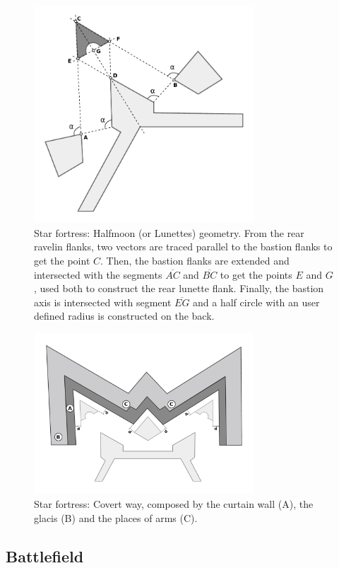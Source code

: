 \documentclass[tog]{acmsiggraph}
\begin{document}
\begin{figure}[h]
  \centering
  \includegraphics[width=3.25in]{figs/halfmoon}
  \caption{Star fortress: Halfmoon (or Lunettes) geometry. From the rear ravelin flanks, two vectors are traced parallel to the bastion flanks to get the point $C$.
Then, the bastion flanks are extended and intersected with the segments $\overline{AC}$ and $\overline{BC}$ to get the points $E$ and $G$, used both to construct the rear lunette flank.
Finally, the bastion axis is intersected with segment $\overline{EG}$ and a half circle with an user defined radius is constructed on the back. }
  \label{fig:halfmoon}
\end{figure}



\begin{figure}[!h]
  \centering
  \includegraphics[width=3.25in]{figs/covertway}
  \caption{Star fortress: Covert way, composed by the curtain wall (A), the glacis (B) and the places of arms (C). }
  \label{fig:covertway}
\end{figure}




\newpage

\subsection{Battlefield}
\label{sec:settingsbattlefield}
\end{document}
